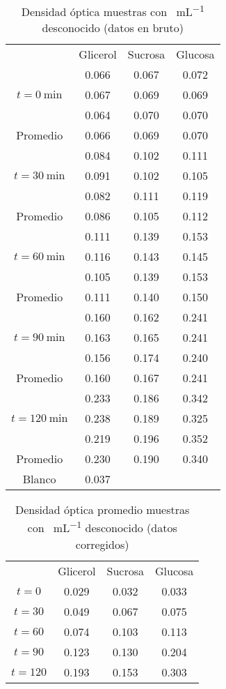 \begin{table}[H]
  \centering
  \begin{tabular}{cccc}\toprule
    & Glicerol & Sucrosa & Glucosa \\ \cmidrule{2-4}
    \multirow{3}{*}{$t=\SI{0}{\minute}$} & 0.066 & 0.067 & 0.072 \\
    & 0.067 & 0.069 & 0.069 \\
    & 0.064 & 0.070 & 0.070 \\ 
    Promedio & 0.066 & 0.069 & 0.070 \\ \midrule
    \multirow{3}{*}{$t=\SI{30}{\minute}$} & 0.084 & 0.102 & 0.111 \\
    & 0.091 & 0.102 & 0.105 \\
    & 0.082 & 0.111 & 0.119 \\
    Promedio & 0.086 & 0.105 & 0.112 \\ \midrule
    \multirow{3}{*}{$t=\SI{60}{\minute}$} & 0.111 & 0.139 & 0.153 \\
    & 0.116 & 0.143 & 0.145 \\
    & 0.105 & 0.139 & 0.153 \\
    Promedio & 0.111 & 0.140 & 0.150 \\ \midrule
    \multirow{3}{*}{$t=\SI{90}{\minute}$} & 0.160 & 0.162 & 0.241 \\
    & 0.163 & 0.165 & 0.241 \\
    & 0.156 & 0.174 & 0.240 \\
    Promedio & 0.160 & 0.167 & 0.241 \\ \midrule
    \multirow{3}{*}{$t=\SI{120}{\minute}$} & 0.233 & 0.186 & 0.342\\
    & 0.238 & 0.189 & 0.325 \\
    & 0.219 & 0.196 & 0.352 \\
    Promedio & 0.230 & 0.190 & 0.340 \\ \midrule
    Blanco & 0.037 \\ \bottomrule
  \end{tabular}
  \caption{Densidad óptica muestras con \si{\ufc\per\mL} desconocido (datos en bruto)}
  \label{tab:growth_brut}
\end{table}

\begin{table}[H]
  \centering
  \begin{tabular}{cccc}\toprule
    & Glicerol & Sucrosa & Glucosa \\ \cmidrule{2-4}
    $t=0$ & 0.029 & 0.032 & 0.033 \\ 
    $t=30$ & 0.049 & 0.067 & 0.075 \\ 
    $t=60$ & 0.074 & 0.103 & 0.113 \\ 
    $t=90$ & 0.123 & 0.130 & 0.204 \\ 
    $t=120$ & 0.193 & 0.153 & 0.303 \\ \bottomrule
  \end{tabular}
  \caption{Densidad óptica promedio muestras con \si{\ufc\per\mL} desconocido (datos corregidos)}
  \label{tab:growth_fixed}
\end{table}


